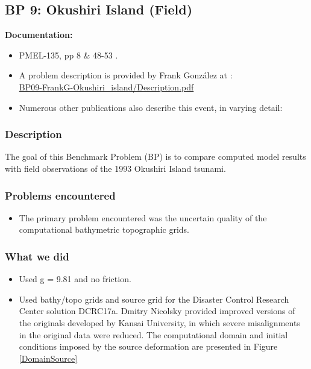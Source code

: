 \newsection

\subsection{BP 9:
 Okushiri Island (Field)}

{\bf Documentation:}
\begin{itemize} 
\item PMEL-135, pp 8 \& 48-53 \cite{SynolakisBernard:pmel135}.
\item A problem description is provided by Frank Gonz\'alez 
 at \cite{bp-description}:\\
\href{https://github.com/rjleveque/nthmp-benchmark-problems/blob/master/BP09-FrankG-Okushiri\_island/Description.pdf} 
{BP09-FrankG-Okushiri\_island/Description.pdf} 
\item Numerous other publications also describe this event, in varying detail: 
\cite{DCRC1994,HTSG1993,KatoTsuji1994,TakahashiEtAl1995,Takahashi1996}
\end{itemize} 

\subsubsection{Description}
The goal of this Benchmark Problem (BP) is to compare computed model results with field observations of the 1993 Okushiri Island tsunami.

\subsubsection {Problems encountered}

\begin {itemize}
\item The primary problem encountered was the uncertain quality of the computational bathymetric topographic grids. 

\end{itemize} 

\subsubsection{What we did}

\begin{itemize}
\item Used g = 9.81 and no friction.
\item Used bathy/topo grids and source grid for the Disaster Control Research Center solution DCRC17a.  Dmitry Nicolsky provided improved versions of the originals developed by Kansai University, in which severe misalignments in the original data were reduced.  The computational domain and initial conditions imposed by the source deformation are presented in Figure \ref{DomainSource}
\end{itemize}

